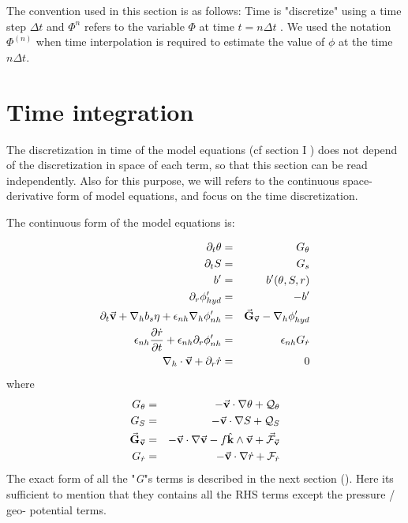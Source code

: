 
The convention used in this section is as follows:
Time is "discretize" using a time step $\Delta t$   
and $\Phi^n$ refers to the variable $\Phi$ 
at time $t = n \Delta t$ . We used the notation $\Phi^{(n)}$
when time interpolation is required to estimate the value of $\phi$
at the time $n \Delta t$.

\section{Time integration}

The discretization in time of the model equations (cf section I )
does not depend of the discretization in space of each
term, so that this section can be read independently.
Also for this purpose, we will refers to the continuous 
space-derivative form of model equations, and focus on 
the time discretization.
 
The continuous form of the model equations is:

\begin{eqnarray}
\partial_t \theta & = & G_\theta
\label{eq-tCsC-theta}
\\
\partial_t S & = & G_s
\label{eq-tCsC-salt}
\\
b' & = & b'(\theta,S,r)
\\
\partial_r \phi'_{hyd} & = & -b'
\label{eq-tCsC-hyd}
\\
\partial_t \vec{\bf v}
+ {\bf \nabla}_h b_s \eta
+ \epsilon_{nh} {\bf \nabla}_h \phi'_{nh}
& = & \vec{\bf G}_{\vec{\bf v}} 
- {\bf \nabla}_h \phi'_{hyd}
\label{eq-tCsC-Hmom}
\\
\epsilon_{nh} \frac {\partial{\dot{r}}}{\partial{t}}
+ \epsilon_{nh} \partial_r \phi'_{nh}
& = & \epsilon_{nh} G_{\dot{r}} 
\label{eq-tCsC-Vmom}
\\
{\bf \nabla}_h \cdot \vec{\bf v} + \partial_r \dot{r}
& = & 0
\label{eq-tCsC-cont}
\end{eqnarray}
where
\begin{eqnarray*}
G_\theta & = &
- \vec{\bf v} \cdot {\bf \nabla} \theta + {\cal Q}_\theta
\\
G_S & = &
- \vec{\bf v} \cdot {\bf \nabla} S + {\cal Q}_S
\\
\vec{\bf G}_{\vec{\bf v}}
& = &
- \vec{\bf v} \cdot {\bf \nabla} \vec{\bf v}
- f \hat{\bf k} \wedge \vec{\bf v}
+ \vec{\cal F}_{\vec{\bf v}}
\\
G_{\dot{r}}
& = &
- \vec{\bf v} \cdot {\bf \nabla} \dot{r}
+ {\cal F}_{\dot{r}}
\end{eqnarray*}
The exact form of all the "{\it G}"s terms is described in the next
section (). Here its sufficient to mention that they contains
all the RHS terms except the pressure / geo- potential terms.

